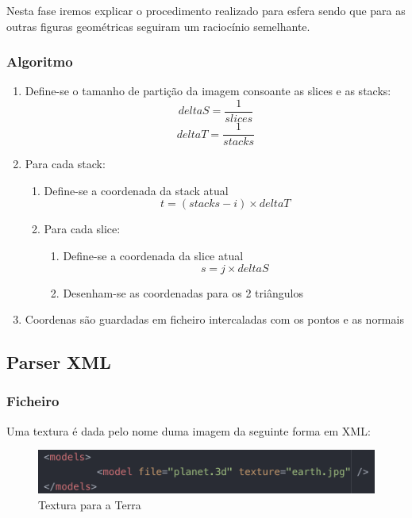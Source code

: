 \documentclass[a4paper]{article}
\begin{document}
Nesta fase iremos explicar o procedimento realizado para esfera sendo que para as outras figuras geométricas seguiram um raciocínio semelhante.

\subsubsection{Algoritmo}
\label{sec:algoritmot}

\ttfamily
\begin{enumerate}
  \item Define-se o tamanho de partição da imagem consoante as slices e as stacks:
   	$$deltaS = \frac{1}{slices}$$  $$deltaT = \frac{1}{stacks}$$
  \item Para cada stack:
  \begin{enumerate}
  	\item Define-se a coordenada da stack atual
	$$ t = (stacks - i) \times deltaT $$
	\item Para cada slice:
	\begin{enumerate}
	 	\item Define-se a coordenada da slice atual
		$$ s = j \times deltaS $$
		\item Desenham-se as coordenadas para os 2 triângulos
	\end{enumerate}
  \end{enumerate}
  \item Coordenas são guardadas em ficheiro intercaladas com os pontos e as normais
\end{enumerate}
\rmfamily


\subsection{Parser XML}
\label{sec:parsert}

\subsubsection{Ficheiro}
\label{sec:ficheirot}

Uma textura é dada pelo nome duma imagem da seguinte forma em XML:

\begin{figure}[H]
\centering
\includegraphics[scale=0.7]{xml_textura.png}
\caption{Textura para a Terra}
\label{img:textura_terra}
\end{figure}
\end{document}
